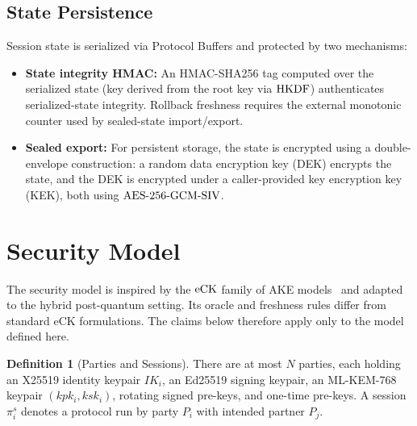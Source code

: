 \documentclass[preprint,12pt]{elsarticle}
\theoremstyle{definition}
\newtheorem{definition}[theorem]{Definition}
\newcommand{\tech}[1]{\textnormal{#1}}
\newcommand{\HKDF}{\tech{HKDF}}
\newcommand{\AEAD}{\tech{AES-256-GCM-SIV}}
\newcommand{\eCK}{\tech{eCK}}
\newcommand{\IK}{\mathit{IK}}
\begin{document}
\subsection{State Persistence}\label{sec:state}

Session state is serialized via Protocol Buffers and protected by two mechanisms:
\begin{itemize}
  \item \textbf{State integrity HMAC:} An HMAC-SHA256 tag computed over the serialized state (key derived from the root key via $\HKDF$) authenticates serialized-state integrity. Rollback freshness requires the external monotonic counter used by sealed-state import/export.
  \item \textbf{Sealed export:} For persistent storage, the state is encrypted using a double-envelope construction: a random data encryption key (DEK) encrypts the state, and the DEK is encrypted under a caller-provided key encryption key (KEK), both using $\AEAD$.
\end{itemize}


\section{Security Model}\label{sec:security-model}

The security model is inspired by the $\eCK$ family of AKE models~\cite{canetti2001,lamacchia2007} and adapted to the hybrid post-quantum setting. Its oracle and freshness rules differ from standard eCK formulations. The claims below therefore apply only to the model defined here.

\begin{definition}[Parties and Sessions]\label{def:parties}
There are at most $N$ parties, each holding an X25519 identity keypair $\IK_i$, an Ed25519 signing keypair, an ML-KEM-768 keypair $(kpk_i, ksk_i)$, rotating signed pre-keys, and one-time pre-keys. A session $\pi_i^s$ denotes a protocol run by party $P_i$ with intended partner $P_j$.
\end{definition}
\end{document}
